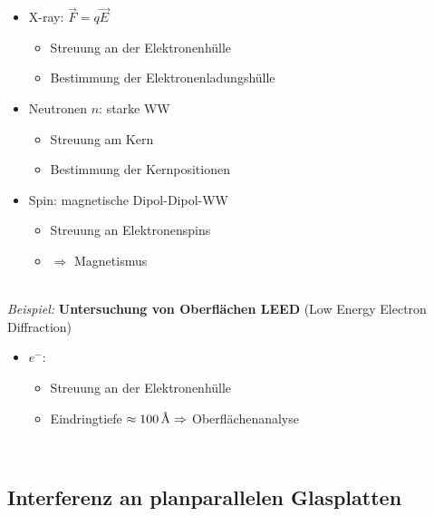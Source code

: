 \begin{itemize}
	\item X-ray: $ \vec{F} = q \vec{E} $
	\begin{itemize}
		\item Streuung an der Elektronenhülle
		\item Bestimmung der Elektronenladungshülle
	\end{itemize}
	\item Neutronen $n$: starke WW
	\begin{itemize}
		\item Streuung am Kern
		\item Bestimmung der Kernpositionen
	\end{itemize}
	\item Spin: magnetische Dipol-Dipol-WW
	\begin{itemize}
		\item Streuung an Elektronenspins
		\item $ \Rightarrow $ Magnetismus
	\end{itemize}
\end{itemize}
\\[10pt]
\emph{Beispiel:} \textbf{Untersuchung von Oberflächen LEED} (Low Energy Electron Diffraction)

\begin{itemize}
	\item $ e^- $:
	\begin{itemize}
		\item Streuung an der Elektronenhülle
		\item Eindringtiefe $ \approx 100 \, \textrm{\AA} \Rightarrow $ Oberflächenanalyse
	\end{itemize}
\end{itemize}
\\

\subsection{Interferenz an planparallelen Glasplatten}

